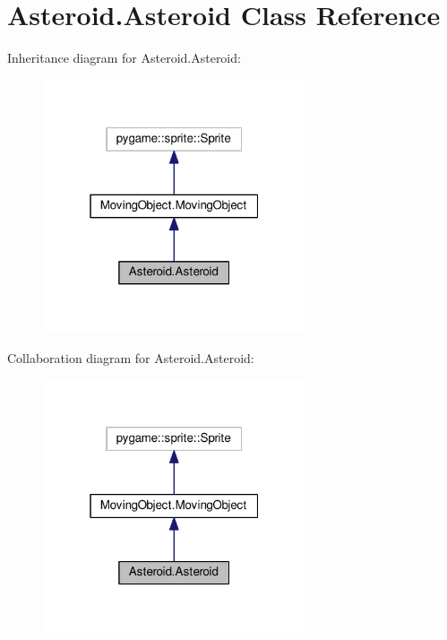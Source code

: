 \hypertarget{classAsteroid_1_1Asteroid}{}\section{Asteroid.\+Asteroid Class Reference}
\label{classAsteroid_1_1Asteroid}


Inheritance diagram for Asteroid.\+Asteroid\+:
\nopagebreak
\begin{figure}[H]
\begin{center}
\leavevmode
\includegraphics[width=220pt]{classAsteroid_1_1Asteroid__inherit__graph}
\end{center}
\end{figure}


Collaboration diagram for Asteroid.\+Asteroid\+:
\nopagebreak
\begin{figure}[H]
\begin{center}
\leavevmode
\includegraphics[width=220pt]{classAsteroid_1_1Asteroid__coll__graph}
\end{center}
\end{figure}
